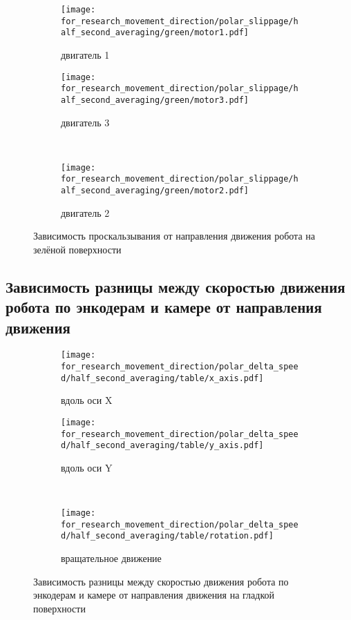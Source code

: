 \begin{figure}[H]
    \centering
    \begin{subfigure}{0.49\textwidth}
        \centering
        \texttt{[image: for\_research\_movement\_direction/polar\_slippage/half\_second\_averaging/green/motor1.pdf]}
        \caption{двигатель 1}
    \end{subfigure}
    \hspace{0.005\textwidth}
    \begin{subfigure}{0.49\textwidth}
        \centering
        \texttt{[image: for\_research\_movement\_direction/polar\_slippage/half\_second\_averaging/green/motor3.pdf]}
        \caption{двигатель 3}
    \end{subfigure} \\
    \vspace{4pt}
    \centering
    \begin{subfigure}{0.49\textwidth}
        \centering
        \texttt{[image: for\_research\_movement\_direction/polar\_slippage/half\_second\_averaging/green/motor2.pdf]}
        \caption{двигатель 2}
    \end{subfigure}
    \caption{Зависимость проскальзывания от направления движения робота на зелёной поверхности}
\end{figure}

\subsection{Зависимость разницы между скоростью движения робота по энкодерам и камере от направления движения}

\begin{figure}[H]
    \centering
    \begin{subfigure}{0.49\textwidth}
        \centering
        \texttt{[image: for\_research\_movement\_direction/polar\_delta\_speed/half\_second\_averaging/table/x\_axis.pdf]}
        \caption{вдоль оси X}
    \end{subfigure}
    \hspace{0.005\textwidth}
    \begin{subfigure}{0.49\textwidth}
        \centering
        \texttt{[image: for\_research\_movement\_direction/polar\_delta\_speed/half\_second\_averaging/table/y\_axis.pdf]}
        \caption{вдоль оси Y}
    \end{subfigure} \\
    \vspace{4pt}
    \centering
    \begin{subfigure}{0.49\textwidth}
        \centering
        \texttt{[image: for\_research\_movement\_direction/polar\_delta\_speed/half\_second\_averaging/table/rotation.pdf]}
        \caption{вращательное движение}
    \end{subfigure}
    \caption{Зависимость разницы между скоростью движения робота по энкодерам и камере от направления движения на гладкой поверхности}
\end{figure}

